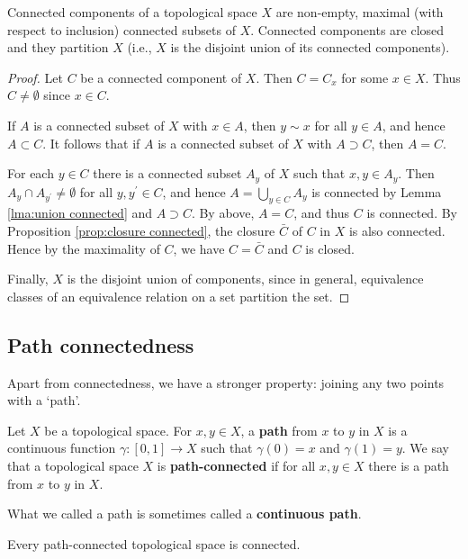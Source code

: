 \documentclass[a4paper]{article}
\begin{document}
\begin{proposition}\label{prop: connected components are maximal and partition}
    Connected components of a topological space $X$ are non-empty, maximal (with respect to inclusion) connected subsets of $X$. Connected components are closed and they partition $X$ (i.e., $X$ is the disjoint union of its connected components).
\end{proposition}
\begin{proof}
    Let $C$ be a connected component of $X$. Then $C=C_{x}$ for some $x \in X$. Thus $C \neq \emptyset$ since $x \in C$.

If $A$ is a connected subset of $X$ with $x \in A$, then $y \sim x$ for all $y \in A$, and hence $A \subset C$. It follows that if $A$ is a connected subset of $X$ with $A \supset C$, then $A=C$.

For each $y \in C$ there is a connected subset $A_{y}$ of $X$ such that $x, y \in A_{y}$. Then $A_{y} \cap A_{y^{\prime}} \neq \emptyset$ for all $y, y^{\prime} \in C$, and hence $A=\bigcup_{y \in C} A_{y}$ is connected by Lemma \ref{lma:union connected} and $A \supset C$. By above, $A=C$, and thus $C$ is connected. By Proposition \ref{prop:closure connected}, the closure $\bar{C}$ of $C$ in $X$ is also connected. Hence by the maximality of $C$, we have $C=\bar{C}$ and $C$ is closed. 

Finally, $X$ is the disjoint union of components, since in general, equivalence classes of an equivalence relation on a set partition the set.
\end{proof}

\subsection{Path connectedness}
Apart from connectedness, we have a stronger property: joining any two points with a `path'.
\begin{definition}
    Let $X$ be a topological space. For $x, y \in X$, a \textbf{path} from $x$ to $y$ in $X$ is a continuous function $\gamma:[0,1] \rightarrow X$ such that $\gamma(0)=x$ and $\gamma(1)=y$. We say that a topological space $X$ is \textbf{path-connected} if for all $x, y \in X$ there is a path from $x$ to $y$ in $X$.
\end{definition}

\begin{note}
    What we called a path is sometimes called a \textbf{continuous path}.
\end{note}

\begin{theorem}\label{thm:path connected is connected}
    Every path-connected topological space is connected.
\end{theorem}
\end{document}

